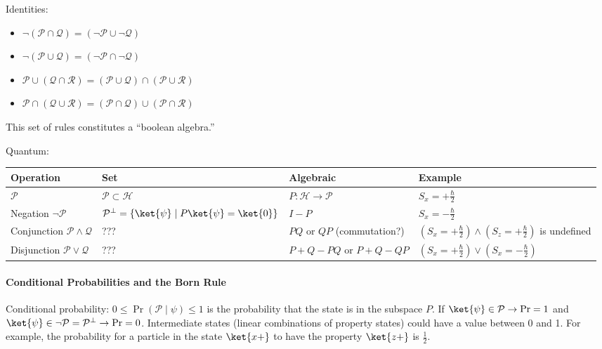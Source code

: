 \documentclass[a4paper,twoside,master.tex]{subfiles}
\begin{document}
Identities:

\begin{itemize}
\item
  $\neg(\mathcal{P}\cap\mathcal{Q}) = (\neg\mathcal{P}\cup\neg\mathcal{Q})$
\item
  $\neg(\mathcal{P}\cup\mathcal{Q}) = (\neg\mathcal{P}\cap\neg\mathcal{Q})$
\item
  $\mathcal{P}\cup(\mathcal{Q}\cap\mathcal{R}) = (\mathcal{P}\cup\mathcal{Q})\cap(\mathcal{P}\cup\mathcal{R})$
\item
  $\mathcal{P}\cap(\mathcal{Q}\cup\mathcal{R}) = (\mathcal{P}\cap\mathcal{Q})\cup(\mathcal{P}\cap\mathcal{R})$
\end{itemize}

This set of rules constitutes a ``boolean algebra.''

Quantum:

\begin{tabular}{@{}llll@{}}
\toprule
Operation & Set & Algebraic & Example\\
\midrule
$\mathcal{P}$ & $\mathcal{P}\subset\mathcal{H}$ & $P\colon\mathcal{H}\to\mathcal{P}$ & $S_x = +\frac{\hbar}{2}$\\
\midrule
Negation $\neg\mathcal{P}$ & $\mathcal{P}^\perp = \{\ket{\psi}\mid P\ket{\psi}=\ket{0}\} $ & $I-P$ & $S_x = -\frac{\hbar}{2}$\\
\midrule
Conjunction $\mathcal{P}\wedge\mathcal{Q}$ & ??? & $PQ$ or $QP$ (commutation?) & $(S_x = +\frac{\hbar}{2})\wedge(S_z = +\frac{\hbar}{2})$ is undefined\\
\midrule
Disjunction $\mathcal{P}\vee\mathcal{Q}$ & ??? & $P+Q-PQ$ or $P+Q-QP$ & $(S_x = +\frac{\hbar}{2})\vee(S_x = -\frac{\hbar}{2})$\\
\bottomrule
\end{tabular}



\hypertarget{header-n160}{%
\paragraph{Conditional Probabilities and the Born
Rule}\label{header-n160}}

Conditional probability: $0\leq \Pr(\mathcal{P}\mid\psi)\leq 1$ is the
probability that the state is in the subspace $P$. If
$\ket{\psi}\in\mathcal{P}\rightarrow \Pr = 1$ and
$\ket{\psi}\in\neg\mathcal{P} = \mathcal{P}^\perp\rightarrow \Pr = 0$.
Intermediate states (linear combinations of property states) could have
a value between 0 and 1. For example, the probability for a particle in
the state $\ket{x+}$ to have the property $\ket{z+}$ is
$\frac{1}{2}$.
\end{document}
